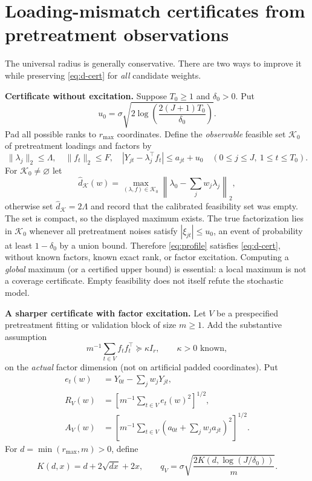 \documentclass[11pt,a4paper]{article}
\newcommand{\norm}[1]{\lVert#1\rVert}
\begin{document}
\section{Loading-mismatch certificates from pretreatment observations}
The universal radius is generally conservative. There are two ways to improve it while preserving \eqref{eq:d-cert} for \emph{all} candidate weights.

\textbf{Certificate without excitation.}
Suppose $T_0\ge1$ and $\delta_0>0$. Put
\[
 u_0=\sigma\sqrt{2\log\!\left(\frac{2(J+1)T_0}{\delta_0}\right)}.
\]
Pad all possible ranks to $r_{\max}$ coordinates. Define the \emph{observable} feasible set $\mathcal K_0$ of pretreatment loadings and factors by
\[
 \norm{\lambda_j}_2\le\Lambda,\quad \norm{f_t}_2\le F,
 \quad |Y_{jt}-\lambda_j^\top f_t|\le a_{jt}+u_0
 \quad (0\le j\le J,\ 1\le t\le T_0).
\]
For $\mathcal K_0\ne\varnothing$ let
\begin{equation}\label{eq:profile}
 \widehat d_{\mathcal K}(w)
 =\max_{(\lambda,f)\in\mathcal K_0}
          \left\|\lambda_0-\sum_jw_j\lambda_j\right\|_2,
\end{equation}
otherwise set $\widehat d_{\mathcal K}=2\Lambda$ and record that the calibrated feasibility set was empty. The set is compact, so the displayed maximum exists. The true factorization lies in $\mathcal K_0$ whenever all pretreatment noises satisfy $|\xi_{jt}|\le u_0$, an event of probability at least $1-\delta_0$ by a union bound. Therefore \eqref{eq:profile} satisfies \eqref{eq:d-cert}, without known factors, known exact rank, or factor excitation. Computing a \emph{global} maximum (or a certified upper bound) is essential: a local maximum is not a coverage certificate. Empty feasibility does not itself refute the stochastic model.

\textbf{A sharper certificate with factor excitation.}
Let $V$ be a prespecified pretreatment fitting or validation block of size $m\ge1$. Add the substantive assumption
\begin{equation}\label{eq:excite}
 m^{-1}\sum_{t\in V}f_tf_t^\top\succeq\kappa I_r,
 \qquad\kappa>0\text{ known},
\end{equation}
on the \emph{actual} factor dimension (not on artificial padded coordinates). Put
\[
 \begin{split}
 e_t(w)&=Y_{0t}-\sum_jw_jY_{jt},\\
 R_V(w)&=\left[m^{-1}\sum_{t\in V}e_t(w)^2\right]^{1/2},\\
 A_V(w)&=\left[m^{-1}\sum_{t\in V}
                 \left(a_{0t}+\sum_jw_ja_{jt}\right)^2\right]^{1/2}.
 \end{split}
\]
For $d=\min(r_{\max},m)>0$, define
\[
 K(d,x)=d+2\sqrt{dx}+2x,\qquad
 q_V=\sigma\sqrt{\frac{2K(d,\log(J/\delta_0))}m}.
\]
\end{document}
